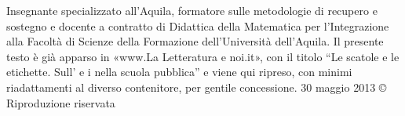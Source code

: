 Insegnante specializzato all'Aquila, formatore sulle metodologie di recupero e sostegno e docente a contratto di Didattica della Matematica per l'Integrazione alla Facoltà di Scienze della Formazione dell'Università dell'Aquila. Il presente testo è già apparso in «www.La Letteratura e noi.it», con il titolo “Le scatole e le etichette. Sull' e i  nella scuola pubblica” e viene qui ripreso, con minimi riadattamenti al diverso contenitore, per gentile concessione. 
30 maggio 2013
© Riproduzione riservata
